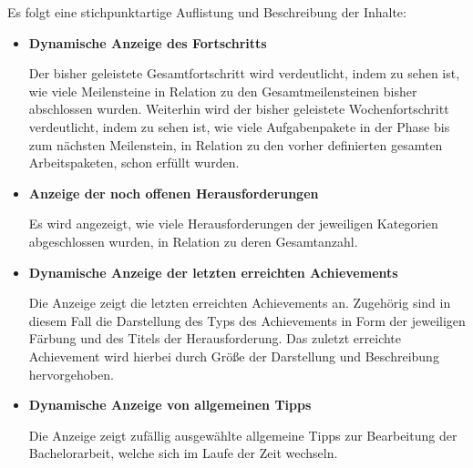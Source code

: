 \documentclass[bibliography=totoc,listof=totoc,BCOR=5mm,DIV=12,oneside]{scrbook}
\begin{document}
\par \medskip Es folgt eine stichpunktartige Auflistung und Beschreibung der Inhalte:
\begin{itemize}
\item \textbf{Dynamische Anzeige des Fortschritts}
\par Der bisher geleistete Gesamtfortschritt wird verdeutlicht, indem zu sehen ist, wie viele Meilensteine in Relation zu den Gesamtmeilensteinen bisher abschlossen wurden. Weiterhin wird der bisher geleistete Wochenfortschritt verdeutlicht, indem zu sehen ist, wie viele Aufgabenpakete in der Phase bis zum nächsten Meilenstein, in Relation zu den vorher definierten gesamten Arbeitspaketen, schon erfüllt wurden.
\item \textbf{Anzeige der noch offenen Herausforderungen}
\par Es wird angezeigt, wie viele Herausforderungen der jeweiligen Kategorien abgeschlossen wurden, in Relation zu deren Gesamtanzahl.
\item \textbf{Dynamische Anzeige der letzten erreichten Achievements}
\par Die Anzeige zeigt die letzten erreichten Achievements an. Zugehörig sind in diesem Fall die Darstellung des Typs des Achievements in Form der jeweiligen Färbung und des Titels der Herausforderung. Das zuletzt erreichte Achievement wird hierbei durch Größe der Darstellung und Beschreibung hervorgehoben.
\item \textbf{Dynamische Anzeige von allgemeinen Tipps}
\par Die Anzeige zeigt zufällig ausgewählte allgemeine Tipps zur Bearbeitung der Bachelorarbeit, welche sich im Laufe der Zeit wechseln. 
\end{itemize}
\end{document}
